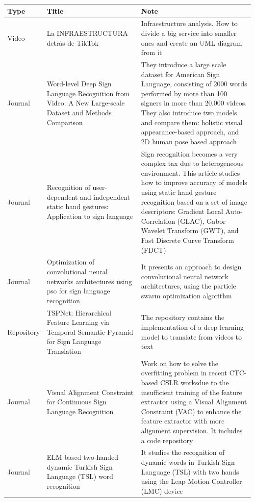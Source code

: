 \begin{longtable}{|p{3cm}|p{4cm}|p{6cm}|}
    \hline {Type} & {Title} & {Note}      \\
    \hline Video & La INFRAESTRUCTURA detrás de TikTok \cite{TikTok2021} & Infraestructure analysis. How to divide a big service into smaller ones and create an UML diagram from it \\
    \hline Journal & Word-level Deep Sign Language Recognition from Video: A New Large-scale Dataset and Methods Comparison \cite{Li2019} & They introduce a large scale dataset for American Sign Language, consisting of 2000 words performed by more than 100 signers in more than 20.000 videos. They also introduce two models and compare them: holistic visual appearance-based approach, and 2D human pose based approach \\
    \hline Journal & Recognition of user-dependent and independent static hand gestures: Application to sign language \cite{Sadeddine2021} & Sign recognition becomes a very complex tax due to heterogeneous environment. This article studies how to improve accuracy of models using static hand gesture recognition based on a set of image descriptors: Gradient Local Auto-Correlation (GLAC), Gabor Wavelet Transform (GWT), and Fast Discrete Curve Transform (FDCT) \\
    \hline Journal & Optimization of convolutional neural networks architectures using pso for sign language recognition \cite{Fregoso2021} & It presents an approach to design convolutional neural network architectures, using the particle swarm optimization algorithm\\
    \hline Repository & TSPNet: Hierarchical Feature Learning via Temporal Semantic Pyramid for Sign Language Translation \cite{SLTTSPNet} & The repository contains the implementation of a deep learning model to translate from videos to text \\
    \hline Journal & Visual Alignment Constraint for Continuous Sign Language Recognition \cite{Min2021} & Work on how to solve the overfitting problem in recent CTC-based CSLR worksdue to the insufficient training of the feature extractor using a Visual Alignment Constraint (VAC) to enhance the feature extractor with more alignment supervision. It includes a code repository \\
    \hline Journal & ELM based two-handed dynamic Turkish Sign Language (TSL) word recognition \cite{ELM2021} & It studies the recognition of dynamic words in Turkish Sign Language (TSL) with two hands using the Leap Motion Controller (LMC) device \\

\end{longtable}
